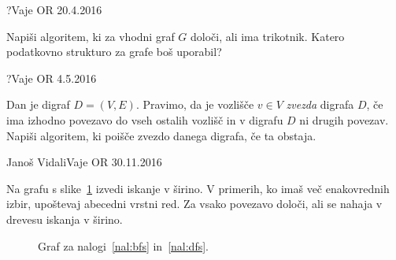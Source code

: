 \begin{naloga}{?}{Vaje OR 20.4.2016}
\begin{vprasanje}
Napiši algoritem, ki za vhodni graf $G$ določi, ali ima trikotnik.
Katero podatkovno strukturo za grafe boš uporabil?
\end{vprasanje}
\begin{odgovor}
\end{odgovor}
\end{naloga}


\begin{naloga}{?}{Vaje OR 4.5.2016}
\begin{vprasanje}
Dan je digraf $D = (V, E)$.
Pravimo, da je vozlišče $v \in V$ {\em zvezda} digrafa $D$,
če ima izhodno povezavo do vseh ostalih vozlišč
in v digrafu $D$ ni drugih povezav.
Napiši algoritem, ki poišče zvezdo danega digrafa, če ta obstaja.
\end{vprasanje}
\begin{odgovor}
\end{odgovor}
\end{naloga}


\begin{naloga}{Janoš Vidali}{Vaje OR 30.11.2016}
\begin{vprasanje}
Na grafu s slike~\ref{fig:bdfs} izvedi iskanje v širino.
V primerih, ko imaš več ena\-ko\-vred\-nih izbir,
upoštevaj abecedni vrstni red.
Za vsako povezavo določi, ali se nahaja v drevesu iskanja v širino.

\begin{figure}[t]
\centering
{}
\caption{Graf za nalogi~\ref{nal:bfs} in~\ref{nal:dfs}.}
\label{fig:bdfs}
\end{figure}
\end{vprasanje}
\begin{odgovor}
\end{odgovor}
\end{naloga}


